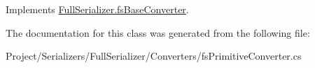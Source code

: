 Implements \hyperlink{class_full_serializer_1_1fs_base_converter_aeb0065770e53ecaac3f5dd3b5cd670d1}{Full\+Serializer.\+fs\+Base\+Converter}.



The documentation for this class was generated from the following file\+:\begin{DoxyCompactItemize}
\item 
Project/\+Serializers/\+Full\+Serializer/\+Converters/fs\+Primitive\+Converter.\+cs\end{DoxyCompactItemize}
